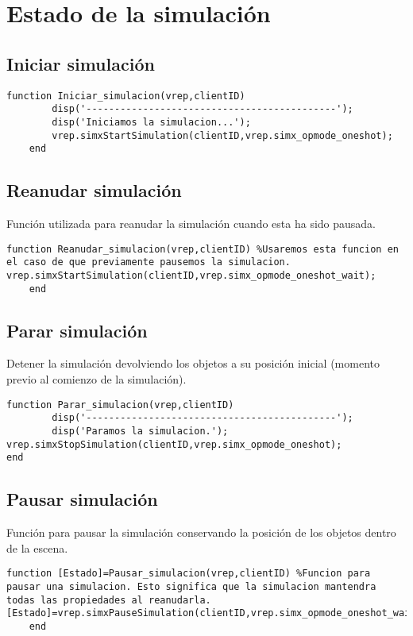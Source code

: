 \section{Estado de la simulación}
\subsection{Iniciar simulación}
\lstset{language=Matlab, breaklines=true, basicstyle=\footnotesize}
\lstset{numbers=left, numberstyle=\tiny, stepnumber=1, numbersep=-2pt}
\begin{lstlisting}[frame=single]
function Iniciar_simulacion(vrep,clientID)  
        disp('--------------------------------------------');
        disp('Iniciamos la simulacion...');
        vrep.simxStartSimulation(clientID,vrep.simx_opmode_oneshot);
    end
\end{lstlisting}
\subsection{Reanudar simulación}
Función utilizada para reanudar la simulación cuando esta ha sido pausada.
\lstset{language=Matlab, breaklines=true, basicstyle=\footnotesize}
\lstset{numbers=left, numberstyle=\tiny, stepnumber=1, numbersep=-2pt}
\begin{lstlisting}[frame=single]
function Reanudar_simulacion(vrep,clientID) %Usaremos esta funcion en el caso de que previamente pausemos la simulacion.    vrep.simxStartSimulation(clientID,vrep.simx_opmode_oneshot_wait);
    end
\end{lstlisting}
\subsection{Parar simulación}
Detener la simulación devolviendo los objetos a su posición inicial (momento previo al comienzo de la simulación).
\lstset{language=Matlab, breaklines=true, basicstyle=\footnotesize}
\lstset{numbers=left, numberstyle=\tiny, stepnumber=1, numbersep=-2pt}
\begin{lstlisting}[frame=single]
function Parar_simulacion(vrep,clientID)
        disp('--------------------------------------------');
        disp('Paramos la simulacion.');       vrep.simxStopSimulation(clientID,vrep.simx_opmode_oneshot);
end
\end{lstlisting}
\subsection{Pausar simulación}
Función para pausar la simulación conservando la posición de los objetos dentro de la escena.
\begin{lstlisting}[frame=single]
function [Estado]=Pausar_simulacion(vrep,clientID) %Funcion para pausar una simulacion. Esto significa que la simulacion mantendra todas las propiedades al reanudarla.      [Estado]=vrep.simxPauseSimulation(clientID,vrep.simx_opmode_oneshot_wait);
    end
\end{lstlisting}
